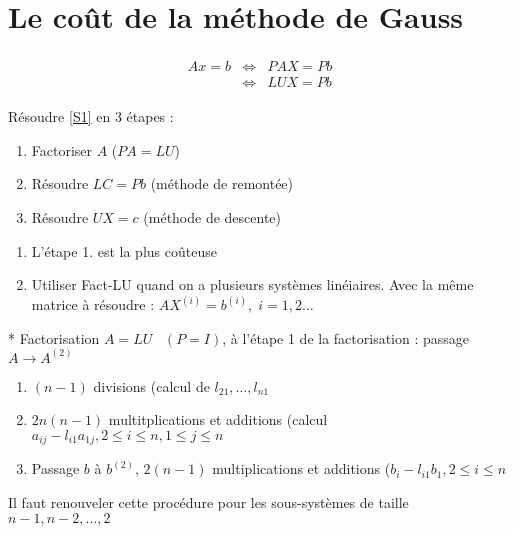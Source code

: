 \documentclass[a4paper,11pt]{article}
\theoremstyle{plain} %
\begin{document}
\section{Le coût de la méthode de Gauss}

\begin{eqnarray}
    \begin{split}
        Ax = b & \Leftrightarrow & PAX = Pb \\
        & \Leftrightarrow & LUX = Pb
    \end{split}
    \label{S1}
\end{eqnarray}

Résoudre \ref{S1} en 3 étapes :
\begin{enumerate}
    \item Factoriser $A$ ($PA = LU$)
    \item Résoudre $LC = Pb$ (méthode de remontée)
    \item Résoudre $UX = c$ (méthode de descente)
\end{enumerate}

\vspace{1cm}
\begin{remark}
    \begin{enumerate}
        \item L'étape 1. est la plus coûteuse
        \item Utiliser Fact-LU quand on a plusieurs systèmes linéiaires. Avec la même matrice à résoudre : $AX^{(i)}=b^{(i)}, \; i = 1,2 \dots$
    \end{enumerate}
\end{remark}

\vspace{1cm}

* Factorisation $A=LU \; \; \; (P=I)$, à l'étape 1 de la factorisation : passage $A \to A^{(2)}$

\begin{enumerate}
    \item $(n-1)$ divisions (calcul de $l_{21}, \dots, l_{n1}$
    \item $2n(n-1)$ multitplications et additions (calcul $a_{ij}-l_{i1}a_{1j}, 2 \leq i \leq n, 1 \leq j \leq n$
    \item Passage $b$ à $b^{(2)}$, $2(n-1)$ multiplications et additions ($b_i - l_{i1}b_{1}, 2 \leq i \leq n$
\end{enumerate}

Il faut renouveler cette procédure pour les sous-systèmes de taille $n-1,n-2,\dots,2$
\end{document}
